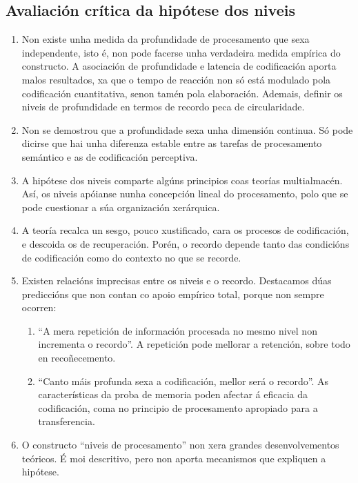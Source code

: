\documentclass[a4paper,11pt]{article}
\begin{document}
\subsection{Avaliación crítica da hipótese dos niveis}
\begin{enumerate}
	\item Non existe unha medida da profundidade de procesamento que sexa independente, isto é, non 		pode facerse unha verdadeira medida empírica do constructo. A asociación de profundidade e 				latencia de codificación aporta malos resultados, xa que o tempo de reacción non só está modulado 	pola codificación cuantitativa, senon tamén pola elaboración. Ademais, definir os niveis de 			profundidade en termos de recordo peca de circularidade.
	\item Non se demostrou que a profundidade sexa unha dimensión continua. Só pode dicirse que hai
	unha diferenza estable entre as tarefas de procesamento semántico e as de codificación
	perceptiva.
	\item A  hipótese dos niveis comparte algúns principios coas teorías multialmacén. Así, os niveis 	apóianse nunha concepción lineal do procesamento, polo que se pode cuestionar a súa organización
	xerárquica.
	\item A teoría recalca un sesgo, pouco xustificado, cara os procesos de codificación, e descoida
	os de recuperación. Porén, o recordo depende tanto das condicións de codificación como do
	contexto no que se recorde.
	\item Existen relacións imprecisas entre os niveis e o recordo. Destacamos dúas prediccións que
	non contan co apoio empírico total, porque non sempre ocorren:
	\begin{enumerate}
		\item ``A mera repetición de información procesada no mesmo nivel non incrementa o recordo''.
		A repetición pode mellorar a retención, sobre todo en recoñecemento.
		\item ``Canto máis profunda sexa a codificación, mellor será o recordo''. As características 			da proba de memoria poden afectar á eficacia da codificación, coma no principio de 						procesamento apropiado para a transferencia.
	\end{enumerate}	
	\item O constructo ``niveis de procesamento'' non xera grandes desenvolvementos teóricos. É moi
	descritivo, pero non aporta mecanismos que expliquen a hipótese.
\end{enumerate}
\end{document}
